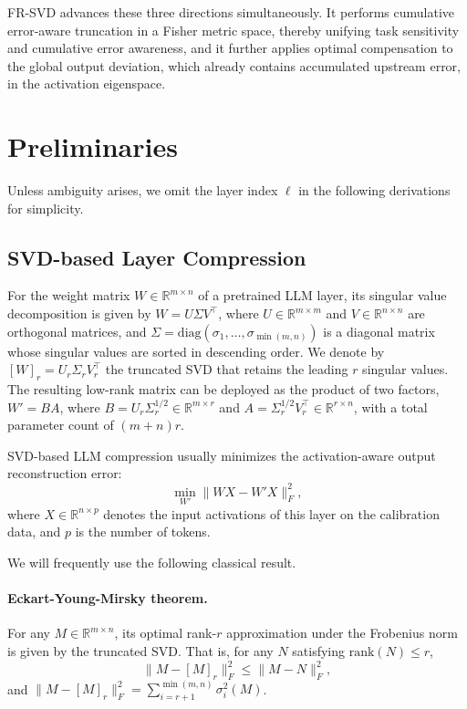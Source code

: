 \documentclass[a4paper,fleqn]{cas-dc}
\begin{document}
FR-SVD advances these three directions simultaneously. It performs cumulative error-aware truncation in a Fisher metric space, thereby unifying task sensitivity and cumulative error awareness, and it further applies optimal compensation to the global output deviation, which already contains accumulated upstream error, in the activation eigenspace.

\section{Preliminaries}

Unless ambiguity arises, we omit the layer index $\ell$ in the following derivations for simplicity.

\subsection{SVD-based Layer Compression}

For the weight matrix $W \in \mathbb{R}^{m \times n}$ of a pretrained LLM layer, its singular value decomposition is given by $W = U \Sigma V^\top$, where $U \in \mathbb{R}^{m \times m}$ and $V \in \mathbb{R}^{n \times n}$ are orthogonal matrices, and $\Sigma = \mathrm{diag}(\sigma_1, \ldots, \sigma_{\min(m,n)})$ is a diagonal matrix whose singular values are sorted in descending order. We denote by $[W]_r = U_r \Sigma_r V_r^\top$ the truncated SVD that retains the leading $r$ singular values. The resulting low-rank matrix can be deployed as the product of two factors, $W' = BA$, where $B = U_r \Sigma_r^{1/2} \in \mathbb{R}^{m \times r}$ and $A = \Sigma_r^{1/2} V_r^\top \in \mathbb{R}^{r \times n}$, with a total parameter count of $(m+n)r$.

SVD-based LLM compression usually minimizes the activation-aware output reconstruction error:
\begin{equation}
\min_{W'} \|WX - W'X\|_F^2,
\tag{P1}
\end{equation}
where $X \in \mathbb{R}^{n \times p}$ denotes the input activations of this layer on the calibration data, and $p$ is the number of tokens.

We will frequently use the following classical result.

\paragraph{Eckart-Young-Mirsky theorem.}
For any $M \in \mathbb{R}^{m \times n}$, its optimal rank-$r$ approximation under the Frobenius norm is given by the truncated SVD. That is, for any $N$ satisfying $\mathrm{rank}(N) \le r$,
\begin{equation}
\|M - [M]_r\|_F^2 \le \|M - N\|_F^2,
\tag{P2}
\end{equation}
and $\|M - [M]_r\|_F^2 = \sum_{i=r+1}^{\min(m,n)} \sigma_i^2(M)$.
\end{document}
